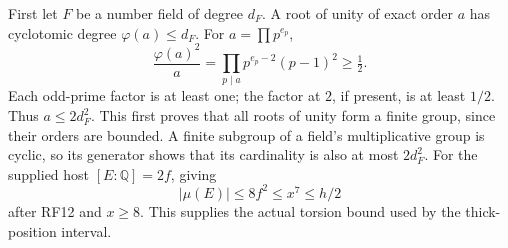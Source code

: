 First let $F$ be a number field of degree $d_F$. A root of unity
of exact order $a$ has cyclotomic degree $\varphi(a)\leq d_F$.
For $a=\prod p^{e_p}$,
\[
  \frac{\varphi(a)^2}{a}
          =\prod_{p\mid a}p^{e_p-2}(p-1)^2\geq\tfrac12.
                                                                    \tag{SZ.18}
\]
Each odd-prime factor is at least one; the factor at $2$, if present,
is at least $1/2$. Thus $a\leq2d_F^2$. This first proves that all
roots of unity form a finite group, since their orders are bounded.
A finite subgroup of a field's multiplicative group is cyclic, so its
generator shows that its cardinality is also at most $2d_F^2$.
For the supplied host $[E:\mathbb Q]=2f$, giving
\[
             |\mu(E)|\leq8f^2\leq x^7\leq h/2             \tag{SZ.19}
\]
after RF12 and $x\geq8$. This supplies the actual torsion bound used
by the thick-position interval.

